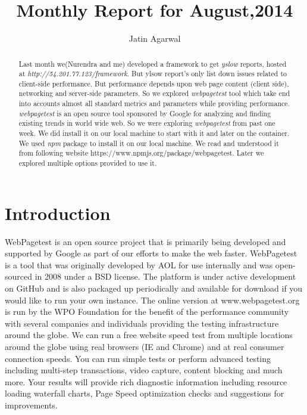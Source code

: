 \documentclass[a4paper,10pt]{article}
\title{Monthly Report for August,2014}
\author{Jatin Agarwal}
\begin{document}
\maketitle

\begin{abstract}
Last month we(Nurendra and me) developed a framework to get {\it yslow} reports, hosted at {\it http://54.201.77.123/framework}.
But ylsow report's only list down issues related to client-side performance. But performance depends upon  web page content
(client side), networking and server-side parameters. So we explored {\it webpagetest} tool which take end into accounts
almost all standard metrics and parameters while providing performance. {\it webpagetest} is an open source tool sponsored by Google for analyzing
and finding existing trends in world wide web. So we were exploring {\it webpagetest} from past one week. We did install it on our 
local machine to start with it and later on the container. We used {\it npm} package to install it on our local machine. We read
and understood it from following website https://www.npmjs.org/package/webpagetest. Later we explored multiple options
provided to use it.
\end{abstract}

\section{Introduction}
WebPagetest is an open source project that is primarily being developed and supported by Google as part of our efforts to make the web faster.
WebPagetest is a tool that was originally developed by AOL for use internally and was open-sourced in 2008 under a BSD license.
The platform is under active development on GitHub and is also packaged up periodically and available for download if you would
like to run your own instance. The online version at www.webpagetest.org is run by the WPO Foundation for the benefit of the 
performance community with several companies and individuals providing the testing infrastructure around the globe.
We can run a free website speed test from multiple locations around the globe using real browsers (IE and Chrome) and at real consumer
connection speeds. You can run simple tests or perform advanced testing including multi-step transactions, video capture, 
content blocking and much more. Your results will provide rich diagnostic information including resource loading waterfall charts,
Page Speed optimization checks and suggestions for improvements.
\end{document}

